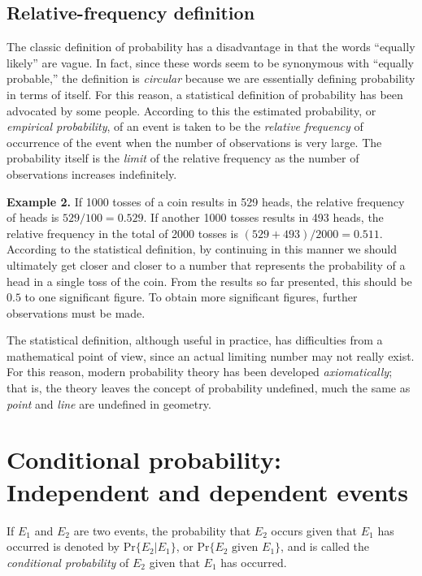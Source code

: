 \documentclass[
]{article}
\begin{document}
\hypertarget{relative-frequency-definition}{%
\subsection{Relative-frequency
definition}\label{relative-frequency-definition}}

The classic definition of probability has a disadvantage in that the
words ``equally likely'' are vague. In fact, since these words seem to
be synonymous with ``equally probable,'' the definition is
\emph{circular} because we are essentially defining probability in terms
of itself. For this reason, a statistical definition of probability has
been advocated by some people. According to this the estimated
probability, or \emph{empirical probability}, of an event is taken to be
the \emph{relative frequency} of occurrence of the event when the number
of observations is very large. The probability itself is the
\emph{limit} of the relative frequency as the number of observations
increases indefinitely.

\textbf{Example 2.} If 1000 tosses of a coin results in 529 heads, the
relative frequency of heads is \(529/100 = 0.529\). If another 1000
tosses results in 493 heads, the relative frequency in the total of 2000
tosses is \((529 + 493)/2000 = 0.511\). According to the statistical
definition, by continuing in this manner we should ultimately get closer
and closer to a number that represents the probability of a head in a
single toss of the coin. From the results so far presented, this should
be \(0.5\) to one significant figure. To obtain more significant
figures, further observations must be made.

The statistical definition, although useful in practice, has
difficulties from a mathematical point of view, since an actual limiting
number may not really exist. For this reason, modern probability theory
has been developed \emph{axiomatically}; that is, the theory leaves the
concept of probability undefined, much the same as \emph{point} and
\emph{line} are undefined in geometry.

\hypertarget{conditional-probability-independent-and-dependent-events}{%
\section{Conditional probability: Independent and dependent
events}\label{conditional-probability-independent-and-dependent-events}}

If \(E_1\) and \(E_2\) are two events, the probability that \(E_2\)
occurs given that \(E_1\) has occurred is denoted by
\(\text{Pr}\{E_2|E_1\}\), or \(\text{Pr}\{E_2 \text{ given } E_1\}\),
and is called the \emph{conditional probability} of \(E_2\) given that
\(E_1\) has occurred.
\end{document}
